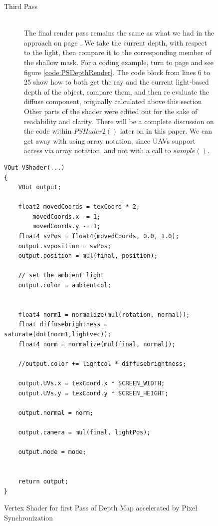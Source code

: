 \documentclass[a4paper, 12pt]{article}
\begin{document}
\begin{figure}[h!]
\begin{description}
\item[Third Pass] \hfill \\ 

The final render pass remains the same as what we had in the approach on page
\pageref{section:DepthMap}. We take the current depth, with respect to the
light, then compare it to the corresponding member of the shallow mask. For a
coding example, turn to page \pageref{code:PSDepthRender} and see figure
\ref{code:PSDepthRender}. The code block from lines 6 to 25 show how to both
get the ray and the current light-based depth of the object, compare them, and
then re evaluate the diffuse component, originally calculated above this
section Other parts of the shader were edited out for the sake of readability
and clarity. There will be a complete discussion on the code within
$PSHader2()$ later on in this paper. We can get away with using array
notation, since UAVs support access via array notation, and not with a call to
$sample()$.

\end{description}
\label{figure:PSDesc}
\end{figure}
\begin{figure}[h!]
\begin{lstlisting}[breaklines=true, language=HLSL]
VOut VShader(...)
{
	VOut output;

	float2 movedCoords = texCoord * 2;
		movedCoords.x -= 1;
		movedCoords.y -= 1;
	float4 svPos = float4(movedCoords, 0.0, 1.0);
	output.svposition = svPos;
	output.position = mul(final, position);

	// set the ambient light
	output.color = ambientcol;

	
	float4 norm1 = normalize(mul(rotation, normal));
	float diffusebrightness = saturate(dot(norm1,lightvec));
	float4 norm = normalize(mul(final, normal));

	//output.color += lightcol * diffusebrightness;

	output.UVs.x = texCoord.x * SCREEN_WIDTH;
	output.UVs.y = texCoord.y * SCREEN_HEIGHT;

	output.normal = norm;

	output.camera = mul(final, lightPos);

	output.mode = mode;


	return output;
}
\end{lstlisting}
\caption{Vertex Shader for first Pass of Depth Map accelerated by Pixel 
Synchronization}
\label{code:VShaderPSDepth}
\end{figure}
\end{document}
